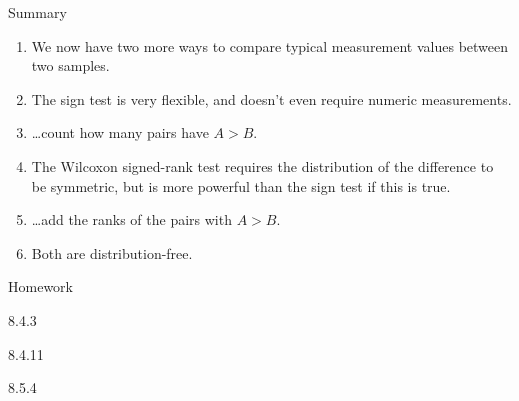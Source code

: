 \begin{frame}{Summary}
  \begin{enumerate}
      \item We now have two more ways to compare typical measurement values between two samples.
      \item The \alert{sign test} is very flexible, and doesn't even require numeric measurements.
      \item \ldots count how many pairs have $A>B$.
      \item The Wilcoxon signed-rank test requires the distribution of the difference to be symmetric, but is more powerful than the sign test if this is true.
      \item \ldots add the ranks of the pairs with $A>B$.
      \item Both are distribution-free.
  \end{enumerate}
\end{frame}

\begin{frame}{Homework}
  \begin{center}

  8.4.3

  \vspace{2em}

  8.4.11

  \vspace{2em}

  8.5.4


  \end{center}
\end{frame}








